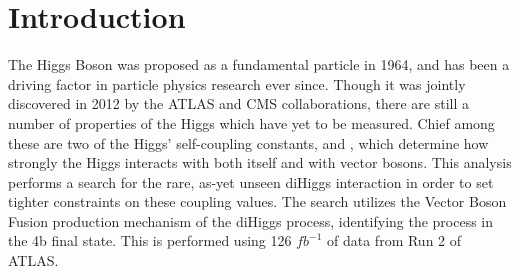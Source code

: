 \chapter{Introduction}\label{chapter:introduction}

%

The Higgs Boson was proposed as a fundamental particle in 1964,
    and has been a driving factor in particle physics research ever since.
Though it was jointly discovered in 2012 by the ATLAS and CMS collaborations,
    there are still a number of properties of the Higgs which have yet to be measured.
Chief among these are two of the Higgs' self-coupling constants, \kl and \kvv,
    which determine how strongly the Higgs interacts with both itself and with vector bosons.
This analysis performs a search for the rare,
    as-yet unseen diHiggs interaction in order to set tighter constraints on these coupling values.
The search utilizes the Vector Boson Fusion production mechanism of the diHiggs process,
    identifying the process in the 4b final state.
This is performed using 126 $\textit{fb}^{-1}$ of data from Run 2 of ATLAS.


